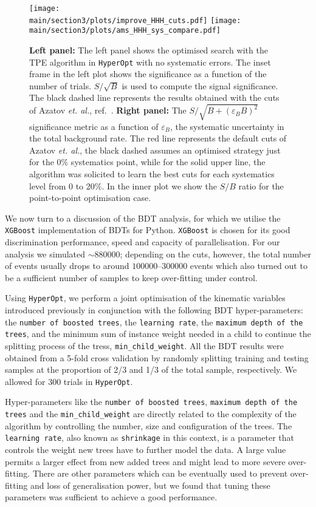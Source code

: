 \begin{figure}[!t]
\centering
\texttt{[image: \\main/section3/plots/improve\_HHH\_cuts.pdf]}
\texttt{[image: \\main/section3/plots/ams\_HHH\_sys\_compare.pdf]}
\caption{\textbf{Left panel:} The left panel shows the optimised search with the TPE algorithm in \texttt{HyperOpt} with no systematic errors. The inset frame in the left plot shows the significance as a function of the number of trials. $S/\sqrt{B}$ is used to compute the signal significance. The black dashed line represents the results obtained with the cuts of Azatov \emph{et. al.}, ref.~\cite{Azatov:2015oxa}. \textbf{Right panel:} The $S/\sqrt{B+(\varepsilon_B B)^2}$ significance metric as a  function of $\varepsilon_B$, the systematic uncertainty in the total background rate. The red line represents the default cuts of Azatov \emph{et. al.}, the black dashed assumes an optimised strategy just for the 0\% systematics point, while for the solid upper line, the algorithm was solicited to learn the best cuts for each systematics level from 0 to 20\%. In the inner plot we show the $S/B$ ratio for the point-to-point optimisation case. }
\label{fig:BayesianKS}
\end{figure}
%



We now turn to a discussion of the BDT analysis, for which we utilise the \texttt{XGBoost}  implementation of BDTs for Python. \texttt{XGBoost} is chosen for its good discrimination performance, speed and capacity of parallelisation.  For our  analysis we simulated $\sim 880000$; depending on the cuts, however, the total number of events usually drops to around $100000$--$300000$ events which also turned out to be a sufficient number of samples to keep over-fitting under control.

Using \texttt{HyperOpt}, we perform a joint optimisation of the kinematic variables introduced previously in conjunction with the following BDT hyper-parameters: the \texttt{number of boosted trees}, the \texttt{learning rate}, the \texttt{maximum depth of the trees}, and the minimum sum of instance weight needed in a child to continue the splitting process of the tress, \texttt{min\_child\_weight}. All the BDT results were obtained from a 5-fold cross validation by randomly splitting training and testing samples at the proportion of 2/3 and 1/3 of the total sample, respectively. We allowed for 300 trials in \texttt{HyperOpt}. 

Hyper-parameters like the \texttt{number of boosted trees}, \texttt{maximum depth of the trees} and the \texttt{min\_child\_weight} are directly related to the complexity of the algorithm by controlling the number, size and configuration of the trees. The \texttt{learning rate}, also known as \texttt{shrinkage} in this context, is a parameter that controls the weight new trees have to further model the data. A large value permits a larger effect from new added trees and might lead to more severe over-fitting. There are other parameters which can be eventually used to prevent over-fitting and loss of generalisation power, but we found that tuning these parameters was sufficient to achieve a good performance.


